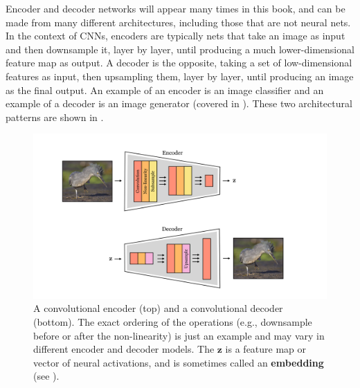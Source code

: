 Encoder and decoder networks will appear many times in this book, and can be made from many different architectures, including those that are not neural nets. In the context of CNNs, encoders are typically nets that take an image as input and then downsample it, layer by layer, until producing a much lower-dimensional feature map as output. A decoder is the opposite, taking a set of low-dimensional features as input, then upsampling them, layer by layer, until producing an image as the final output. An example of an encoder is an image classifier and an example of a decoder is an image generator (covered in \chap{\ref{chapter:generative_models}}). These two architectural patterns are shown in \fig{\ref{fig:convolutional_neural_nets:encoders_and_decoders}}.
\begin{figure}[h]
    \centerline{
        \includegraphics[width=0.75\linewidth]{./figures/convolutional_neural_nets/encoders_and_decoders.pdf}
    }
    \caption{A convolutional encoder (top) and a convolutional decoder (bottom). The exact ordering of the operations (e.g., downsample before or after the non-linearity) is just an example and may vary in different encoder and decoder models. The $\mathbf{z}$ is a feature map or vector of neural activations, and is sometimes called an \textbf{embedding} (see \chap{\ref{chapter:representation_learning}}).}
    \label{fig:convolutional_neural_nets:encoders_and_decoders}
\end{figure}

